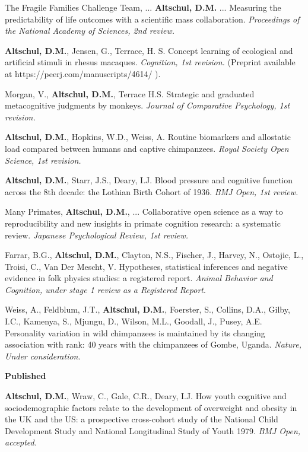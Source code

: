 \documentclass[margin,line]{res}
\begin{document}
\begin{resume}
The Fragile Families Challenge Team, ... {\bf Altschul, D.M.} ... Measuring the predictability of life outcomes with a scientific mass collaboration. {\it Proceedings of the National Academy of Sciences, 2nd review.}

{\bf Altschul, D.M.}, Jensen, G.,  Terrace, H. S. Concept learning of ecological and artificial stimuli in rhesus macaques. {\it Cognition, 1st revision.} (Preprint available at https://peerj.com/manuscripts/4614/ ).

Morgan, V., {\bf Altschul, D.M.}, Terrace H.S. Strategic and graduated metacognitive judgments by monkeys.  {\it Journal of Comparative Psychology, 1st revision.}

{\bf Altschul, D.M.}, Hopkins, W.D., Weiss, A. Routine biomarkers and allostatic load compared between humans and captive chimpanzees. {\it  Royal Society Open Science, 1st revision.}

{\bf Altschul, D.M.}, Starr, J.S., Deary, I.J. Blood pressure and cognitive function across the 8th decade: the Lothian Birth Cohort of 1936. {\it BMJ Open, 1st review.}

Many Primates, {\bf Altschul, D.M.}, ... Collaborative open science as a way to reproducibility and new insights in primate cognition research: a systematic review. {\it Japanese Psychological Review, 1st review.}

Farrar, B.G., {\bf Altschul, D.M.}, Clayton, N.S., Fischer, J., Harvey, N., Ostojic, L., Troisi, C., Van Der Mescht, V. Hypotheses, statistical inferences and negative evidence in folk physics studies: a registered report. {\it Animal Behavior and Cognition, under stage 1 review as a Registered Report}.

Weiss, A., Feldblum, J.T., {\bf Altschul, D.M.}, Foerster, S., Collins, D.A., Gilby, I.C., Kamenya, S., Mjungu, D., Wilson, M.L., Goodall, J., Pusey, A.E. Personality variation in wild chimpanzees is maintained by its changing association with rank: 40 years with the chimpanzees of Gombe, Uganda. {\it Nature, Under consideration}.


\vspace{0.2cm}

{\bf Published}

{\bf Altschul, D.M.}, Wraw, C., Gale, C.R., Deary, I.J. How youth cognitive and sociodemographic factors relate to the development of overweight and obesity in the UK and the US: a prospective cross-cohort study of the National Child Development Study and National Longitudinal Study of Youth 1979. {\it BMJ Open, accepted.}


\end{resume}
\end{document}
